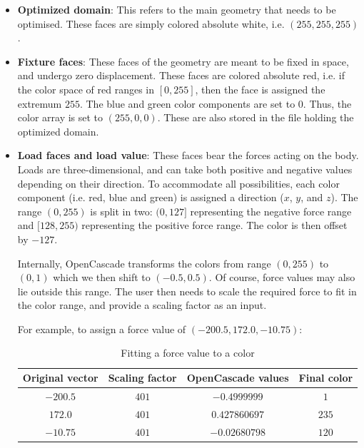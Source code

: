 \begin{itemize}
	\item \textbf{Optimized domain}: This refers to the main geometry that needs to be optimised. These faces are simply colored absolute white, i.e. $(255, 255, 255)$.
	\item \textbf{Fixture faces}: These faces of the geometry are meant to be fixed in space, and undergo zero displacement. These faces are colored absolute red, i.e. if the color space of red ranges in {$[0, 255]$}, then the face is assigned the extremum $255$. The blue and green color components are set to $0$. Thus, the color array is set to $(255, 0, 0)$. These are also stored in the file holding the optimized domain.
	\item \textbf{Load faces and load value}: These faces bear the forces acting on the body. Loads are three-dimensional, and can take both positive and negative values depending on their direction. To accommodate all possibilities, each color component (i.e. red, blue and green) is assigned a direction ($x$, $y$, and $z$). The range $(0, 255)$ is split in two: $(0, 127]$ representing the negative force range and $[128, 255)$ representing the positive force range. The color is then offset by $-127$. 

Internally, OpenCascade transforms the colors from range $(0, 255)$ to $(0,1)$ which we then shift to $(-0.5, 0.5)$. Of course, force values may also lie outside this range. The user then needs to scale the required force to fit in the color range, and provide a scaling factor as an input.

For example, to assign a force value of $(-200.5, 172.0, -10.75)$:


\begin{table}[h!]
	\begin{center}
		\caption{Fitting a force value to a color}
		\label{LoadFaceExample}
		\begin{tabular}{cccc}
			\toprule
			{\small Original vector} & {\small Scaling factor} & {\small OpenCascade values} & {\small Final color}\\
			\midrule
			$-200.5$ & $401$ & $-0.4999999$ & $1$\\
			$172.0$  & $401$ & $0.427860697$  & $235$\\
			$-10.75$ & $401$ & $-0.02680798$   & $120$\\
			\bottomrule
		\end{tabular}
	\end{center}
\end{table}


\end{itemize}
